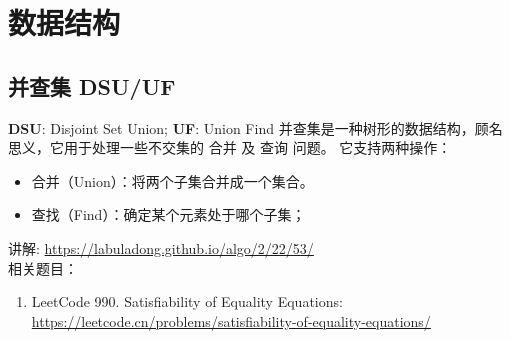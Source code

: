 \chapter{数据结构}

\begin{center}
\end{center}

\section{并查集 DSU/UF}
\textbf{DSU}: Disjoint Set Union; \textbf{UF}: Union Find
并查集是一种树形的数据结构，顾名思义，它用于处理一些不交集的 合并 及 查询 问题。 它支持两种操作： 

\begin{itemize}
    \item 合并（Union）：将两个子集合并成一个集合。
    \item 查找（Find）：确定某个元素处于哪个子集；
\end{itemize}



\ifshowLink
讲解: \href{https://labuladong.github.io/algo/2/22/53/}{https://labuladong.github.io/algo/2/22/53/}\\
相关题目：
    \begin{enumerate}
        \item LeetCode 990. Satisfiability of Equality Equations: \href{https://leetcode.cn/problems/satisfiability-of-equality-equations/}{https://leetcode.cn/problems/satisfiability-of-equality-equations/}
    \end{enumerate}
\fi